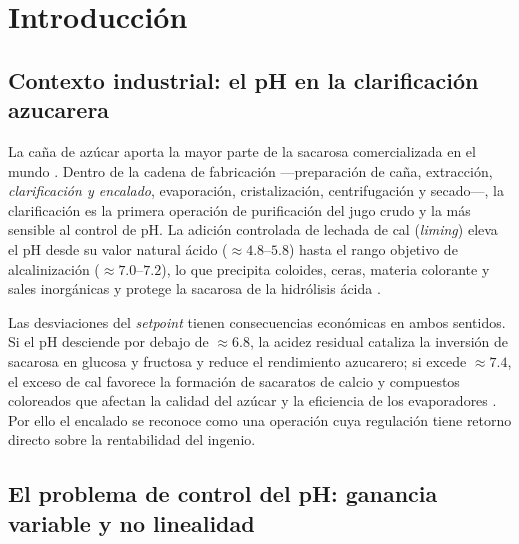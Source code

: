 \setcounter{section}{0}
\renewcommand{\thesection}{\arabic{section}}
\setlength{\parindent}{15pt}

\section{Introducción}

\subsection{Contexto industrial: el pH en la clarificación azucarera}

La caña de azúcar aporta la mayor parte de la sacarosa comercializada en
el mundo \parencite{rein2007cane}. Dentro de la cadena de fabricación
---preparación de caña, extracción, \emph{clarificación y encalado},
evaporación, cristalización, centrifugación y secado---, la clarificación
es la primera operación de purificación del jugo crudo y la más sensible
al control de pH. La adición controlada de lechada de cal
(\textit{liming}) eleva el pH desde su valor natural ácido
($\approx 4.8$--$5.8$) hasta el rango objetivo de alcalinización
($\approx 7.0$--$7.2$), lo que precipita coloides, ceras, materia
colorante y sales inorgánicas y protege la sacarosa de la hidrólisis ácida
\parencite{rein2007cane}.

Las desviaciones del \textit{setpoint} tienen consecuencias económicas en
ambos sentidos. Si el pH desciende por debajo de $\approx 6.8$, la acidez
residual cataliza la inversión de sacarosa en glucosa y fructosa y reduce
el rendimiento azucarero; si excede $\approx 7.4$, el exceso de cal
favorece la formación de sacaratos de calcio y compuestos coloreados que
afectan la calidad del azúcar y la eficiencia de los evaporadores
\parencite{shinskey1996process,rein2007cane}. Por ello el encalado se
reconoce como una operación cuya regulación tiene retorno directo sobre
la rentabilidad del ingenio.

\subsection{El problema de control del pH: ganancia variable y no linealidad}


